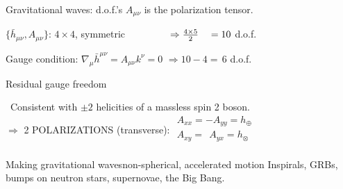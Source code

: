 \documentclass[xcolor=dvipsnames,handout,t]{beamer}
\newcommand{\f}{\frac}
\begin{document}
\begin{frame}{Gravitational waves: d.o.f.'s}
$A_{\mu\nu} $ is the polarization tensor.
\begin{itemize}
{\item $\{ \bar{h}_{\mu\nu}, A_{\mu\nu} \}$: $4\times4$, symmetric {$\hspace{1.5cm}\Rightarrow \f{4\times 5}{2}\ \ \ = 10$ d.o.f.}}
 {\item Gauge condition: $\nabla_\mu \bar{h}^{\mu\nu} =  A_{\mu\nu} k^\nu= 0${ $\Rightarrow10-4 = \,6$ d.o.f.}}
 {\item Residual gauge freedom }
\end{itemize}
{\quad \ Consistent with $\pm 2$ helicities of a \alert{massless} spin 2 boson.\\}
{$\Rightarrow$ \alert{2} POLARIZATIONS (\alert{transverse}): {$\begin{array}{l}A_{xx}=-A_{yy} = h_\oplus  \\ A_{xy}=\ \ A_{yx} = h_\otimes  \\ \end{array}$}}
{\begin{center}  \hspace{1cm} \end{center}}
\end{frame}

\begin{frame}{Making gravitational waves}{non-spherical, accelerated motion}
 \alert{Inspirals}, GRBs, bumps on neutron stars, supernovae, the Big Bang. \\%
 \uncover<3->{\begin{center} $ \boxed{\dot{E}=L_\text{GW} = \f{G}{c^5} \langle (\partial_t^3 \bar{Q}_{ij})^2 \rangle}$\\\vspace{2mm}}
 
\end{frame}
\end{document}
